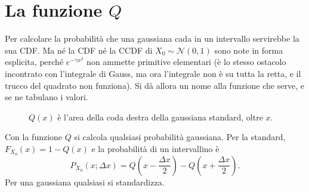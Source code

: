 \section{La funzione \texorpdfstring{$Q$}{Q}}

Per calcolare la probabilità che una gaussiana cada in un intervallo servirebbe la sua CDF. Ma né la CDF né la CCDF di
$X_0 \sim \mathcal{N}(0, 1)$ sono note in forma esplicita, perché $e^{-\gamma x^2}$ non ammette primitive elementari
(è lo stesso ostacolo incontrato con l'integrale di Gauss, ma ora l'integrale non è su tutta la retta, e il trucco del
quadrato non funziona). Si dà allora un nome alla funzione che serve, e se ne tabulano i valori.


\begin{figure}[H]
\centering
{}
\caption{$Q(x)$ è l'area della coda destra della gaussiana standard, oltre $x$.}
\end{figure}

Con la funzione $Q$ si calcola qualsiasi probabilità gaussiana. Per la standard, $F_{X_0}(x) = 1 - Q(x)$ e la probabilità
di un intervallino è
\[ P_{X_0}(x; \Delta x) = Q\left( x - \frac{\Delta x}{2} \right) - Q\left( x + \frac{\Delta x}{2} \right) . \]
Per una gaussiana qualsiasi si standardizza.


